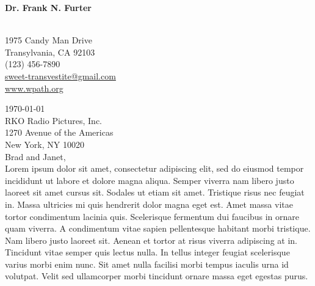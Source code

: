 







\begin{center}
\begin{Large}\textbf{Dr. Frank N. Furter}\end{Large}						\\
1975 Candy Man Drive														\\
Transylvania, CA 92103														\\
(123) 456-7890																\\
\href{mailto:sweet-transvestite@gmail.com}{sweet-transvestite@gmail.com}	\\
\href{https://www.wpath.org/}{www.wpath.org}								\\
\end{center}



\noindent \today						\\

\noindent RKO Radio Pictures, Inc.		\\
1270 Avenue of the Americas				\\
New York, NY 10020						\\



\noindent Brad and Janet,	\\

Lorem ipsum dolor sit amet, consectetur adipiscing elit, sed do eiusmod tempor incididunt ut labore et dolore magna aliqua. Semper viverra nam libero justo laoreet sit amet cursus sit. Sodales ut etiam sit amet. Tristique risus nec feugiat in. Massa ultricies mi quis hendrerit dolor magna eget est. Amet massa vitae tortor condimentum lacinia quis. Scelerisque fermentum dui faucibus in ornare quam viverra. A condimentum vitae sapien pellentesque habitant morbi tristique. Nam libero justo laoreet sit. Aenean et tortor at risus viverra adipiscing at in. Tincidunt vitae semper quis lectus nulla. In tellus integer feugiat scelerisque varius morbi enim nunc. Sit amet nulla facilisi morbi tempus iaculis urna id volutpat. Velit sed ullamcorper morbi tincidunt ornare massa eget egestas purus.

